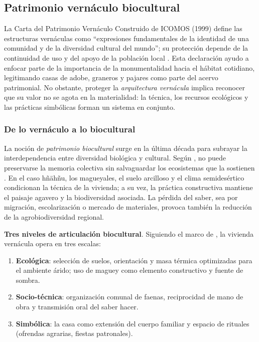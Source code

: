 \subsection{Patrimonio vernáculo biocultural}
\label{subsec:vernaculo_biocultural}

La Carta del Patrimonio Vernáculo Construido de ICOMOS (1999) define las
estructuras vernáculas como ``expresiones fundamentales de la identidad
de una comunidad y de la diversidad cultural del mundo''; su protección
depende de la continuidad de uso y del apoyo de la población local
\citep{icomos1999carta}.  Esta declaración ayudo a enfocar parte de la importancia de la
monumentalidad hacia el hábitat cotidiano, legitimando casas de adobe,
graneros y pajares como parte del acervo patrimonial.  No obstante,
proteger la \emph{arquitectura vernácula} implica reconocer que su valor
no se agota en la materialidad: la técnica, los recursos ecológicos y
las prácticas simbólicas forman un sistema en conjunto.

\subsubsection{De lo vernáculo a lo biocultural}

La noción de \emph{patrimonio biocultural} surge en la última década
para subrayar la interdependencia entre diversidad biológica y cultural.
Según \citeauthor{chang2010patrimonio}, no puede preservarse la memoria
colectiva sin salvaguardar los ecosistemas que la sostienen
\citep{chang2010patrimonio}.  En el caso hñähñu, los
magueyales, el suelo arcilloso y el clima semidesértico condicionan la
técnica de la vivienda; a su vez, la práctica constructiva mantiene el
paisaje agavero y la biodiversidad asociada.  La pérdida del saber,
sea por migración, escolarización o mercado de materiales, provoca
también la reducción de la agrobiodiversidad regional.

\textbf{Tres niveles de articulación biocultural}. Siguiendo el marco de \cite{gudynas2010desarrollo}, la vivienda
vernácula opera en tres escalas:

\begin{enumerate}
	\item \textbf{Ecológica}: selección de suelos, orientación y masa
	      térmica optimizadas para el ambiente árido; uso de maguey como
	      elemento constructivo y fuente de sombra.

	\item \textbf{Socio-técnica}: organización comunal de faenas,
	      reciprocidad de mano de obra y transmisión oral del saber hacer.

	\item \textbf{Simbólica}: la casa como extensión del cuerpo familiar
	      y espacio de rituales (ofrendas agrarias, fiestas patronales).
\end{enumerate}

